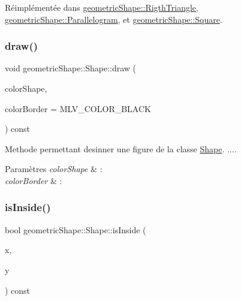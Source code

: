 Réimplémentée dans \hyperlink{classgeometric_shape_1_1_rigth_triangle_ad5d1fe984fa6fa7c6e6764b1530eeeaa}{geometric\+Shape\+::\+Rigth\+Triangle}, \hyperlink{classgeometric_shape_1_1_parallelogram_a3e9f220add215e8f594da75daf19a8c1}{geometric\+Shape\+::\+Parallelogram}, et \hyperlink{classgeometric_shape_1_1_square_a945551a983f2476d6e39c572f7f66ec9}{geometric\+Shape\+::\+Square}.

\mbox{\label{classgeometric_shape_1_1_shape_ae16cafaabf0742f54f718ba319c1afee}} 
\subsubsection{\texorpdfstring{draw()}{draw()}}
{\footnotesize\ttfamily void geometric\+Shape\+::\+Shape\+::draw (\begin{DoxyParamCaption}\item[{M\+L\+V\+\_\+\+Color}]{color\+Shape,  }\item[{M\+L\+V\+\_\+\+Color}]{color\+Border = {\ttfamily MLV\+\_\+COLOR\+\_\+BLACK} }\end{DoxyParamCaption}) const}



Methode permettant desinner une figure de la classe \hyperlink{classgeometric_shape_1_1_shape}{Shape}. .... 


\begin{DoxyParams}{Paramètres}
{\em color\+Shape} & \+: \\
\hline
{\em color\+Border} & \+: \\
\hline
\end{DoxyParams}
\mbox{\label{classgeometric_shape_1_1_shape_a10713940996e923488745dfa7dbe1c46}} 
\subsubsection{\texorpdfstring{is\+Inside()}{isInside()}}
{\footnotesize\ttfamily bool geometric\+Shape\+::\+Shape\+::is\+Inside (\begin{DoxyParamCaption}\item[{const int \&}]{x,  }\item[{const int \&}]{y }\end{DoxyParamCaption}) const}



